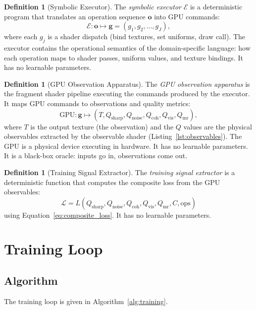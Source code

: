 \documentclass[11pt,twocolumn,a4paper]{article}
\theoremstyle{definition}
\newtheorem{definition}[theorem]{Definition}
\theoremstyle{remark}
\newcommand{\loss}{\mathcal{L}}
\newcommand{\engine}{\mathcal{E}}
\newcommand{\Qsharp}{Q_{\mathrm{sharp}}}
\newcommand{\Qnoise}{Q_{\mathrm{noise}}}
\newcommand{\Qcoh}{Q_{\mathrm{coh}}}
\newcommand{\Qvis}{Q_{\mathrm{vis}}}
\newcommand{\Qmr}{Q_{\mathrm{mr}}}
\begin{document}
\begin{definition}[Symbolic Executor]
\label{def:executor}
The \emph{symbolic executor} $\engine$ is a deterministic program that translates an operation sequence $\mathbf{o}$ into GPU commands:
\[
\engine: \mathbf{o} \mapsto \mathbf{g} = (g_1, g_2, \ldots, g_J),
\]
where each $g_j$ is a shader dispatch (bind textures, set uniforms, draw call). The executor contains the operational semantics of the domain-specific language: how each operation maps to shader passes, uniform values, and texture bindings. It has no learnable parameters.
\end{definition}

\begin{definition}[GPU Observation Apparatus]
\label{def:gpu_apparatus}
The \emph{GPU observation apparatus} is the fragment shader pipeline executing the commands produced by the executor. It maps GPU commands to observations and quality metrics:
\[
\text{GPU}: \mathbf{g} \mapsto (T, \Qsharp, \Qnoise, \Qcoh, \Qvis, \Qmr),
\]
where $T$ is the output texture (the observation) and the $Q$ values are the physical observables extracted by the observable shader (Listing~\ref{lst:observables}). The GPU is a physical device executing in hardware. It has no learnable parameters. It is a black-box oracle: inputs go in, observations come out.
\end{definition}

\begin{definition}[Training Signal Extractor]
\label{def:signal_extractor}
The \emph{training signal extractor} is a deterministic function that computes the composite loss from the GPU observables:
\[
\loss = L(\Qsharp, \Qnoise, \Qcoh, \Qvis, \Qmr, C, \text{ops})
\]
using Equation~\ref{eq:composite_loss}. It has no learnable parameters.
\end{definition}


\section{Training Loop}
\label{sec:training_loop}

\subsection{Algorithm}

The training loop is given in Algorithm~\ref{alg:training}.
\end{document}
